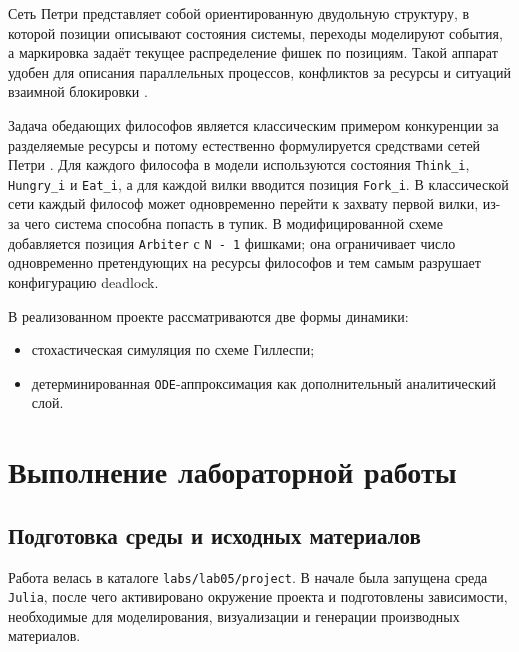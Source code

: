 \documentclass[
  12pt,
  a4paper,
  DIV=11,
  numbers=noendperiod]{scrreprt}
\providecommand{\tightlist}{%
  \setlength{\itemsep}{0pt}\setlength{\parskip}{0pt}}\usepackage{longtable,booktabs,array}
\begin{document}
Сеть Петри представляет собой ориентированную двудольную структуру, в
которой позиции описывают состояния системы, переходы моделируют
события, а маркировка задаёт текущее распределение фишек по позициям.
Такой аппарат удобен для описания параллельных процессов, конфликтов за
ресурсы и ситуаций взаимной блокировки \autocite{murata1989petri}.

Задача обедающих философов является классическим примером конкуренции за
разделяемые ресурсы и потому естественно формулируется средствами сетей
Петри \autocite{korolkova2026simulation}. Для каждого философа в модели
используются состояния \texttt{Think\_i}, \texttt{Hungry\_i} и
\texttt{Eat\_i}, а для каждой вилки вводится позиция \texttt{Fork\_i}. В
классической сети каждый философ может одновременно перейти к захвату
первой вилки, из-за чего система способна попасть в тупик. В
модифицированной схеме добавляется позиция \texttt{Arbiter} с
\texttt{N\ -\ 1} фишками; она ограничивает число одновременно
претендующих на ресурсы философов и тем самым разрушает конфигурацию
deadlock.

В реализованном проекте рассматриваются две формы динамики:

\begin{itemize}
\tightlist
\item
  стохастическая симуляция по схеме Гиллеспи;
\item
  детерминированная \texttt{ODE}-аппроксимация как дополнительный
  аналитический слой.
\end{itemize}

\chapter{Выполнение лабораторной
работы}\label{ux432ux44bux43fux43eux43bux43dux435ux43dux438ux435-ux43bux430ux431ux43eux440ux430ux442ux43eux440ux43dux43eux439-ux440ux430ux431ux43eux442ux44b}

\section{Подготовка среды и исходных
материалов}\label{ux43fux43eux434ux433ux43eux442ux43eux432ux43aux430-ux441ux440ux435ux434ux44b-ux438-ux438ux441ux445ux43eux434ux43dux44bux445-ux43cux430ux442ux435ux440ux438ux430ux43bux43eux432}

Работа велась в каталоге \texttt{labs/lab05/project}. В начале была
запущена среда \texttt{Julia}, после чего активировано окружение проекта
и подготовлены зависимости, необходимые для моделирования, визуализации
и генерации производных материалов.
\end{document}
